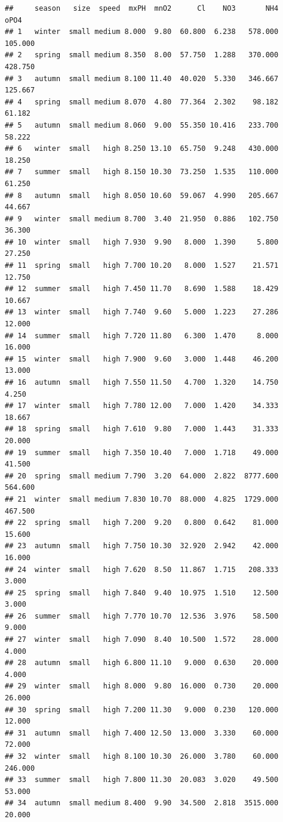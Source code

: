 \documentclass[]{report}
\begin{document}
\begin{verbatim}
##     season   size  speed  mxPH  mnO2      Cl    NO3       NH4    oPO4
## 1   winter  small medium 8.000  9.80  60.800  6.238   578.000 105.000
## 2   spring  small medium 8.350  8.00  57.750  1.288   370.000 428.750
## 3   autumn  small medium 8.100 11.40  40.020  5.330   346.667 125.667
## 4   spring  small medium 8.070  4.80  77.364  2.302    98.182  61.182
## 5   autumn  small medium 8.060  9.00  55.350 10.416   233.700  58.222
## 6   winter  small   high 8.250 13.10  65.750  9.248   430.000  18.250
## 7   summer  small   high 8.150 10.30  73.250  1.535   110.000  61.250
## 8   autumn  small   high 8.050 10.60  59.067  4.990   205.667  44.667
## 9   winter  small medium 8.700  3.40  21.950  0.886   102.750  36.300
## 10  winter  small   high 7.930  9.90   8.000  1.390     5.800  27.250
## 11  spring  small   high 7.700 10.20   8.000  1.527    21.571  12.750
## 12  summer  small   high 7.450 11.70   8.690  1.588    18.429  10.667
## 13  winter  small   high 7.740  9.60   5.000  1.223    27.286  12.000
## 14  summer  small   high 7.720 11.80   6.300  1.470     8.000  16.000
## 15  winter  small   high 7.900  9.60   3.000  1.448    46.200  13.000
## 16  autumn  small   high 7.550 11.50   4.700  1.320    14.750   4.250
## 17  winter  small   high 7.780 12.00   7.000  1.420    34.333  18.667
## 18  spring  small   high 7.610  9.80   7.000  1.443    31.333  20.000
## 19  summer  small   high 7.350 10.40   7.000  1.718    49.000  41.500
## 20  spring  small medium 7.790  3.20  64.000  2.822  8777.600 564.600
## 21  winter  small medium 7.830 10.70  88.000  4.825  1729.000 467.500
## 22  spring  small   high 7.200  9.20   0.800  0.642    81.000  15.600
## 23  autumn  small   high 7.750 10.30  32.920  2.942    42.000  16.000
## 24  winter  small   high 7.620  8.50  11.867  1.715   208.333   3.000
## 25  spring  small   high 7.840  9.40  10.975  1.510    12.500   3.000
## 26  summer  small   high 7.770 10.70  12.536  3.976    58.500   9.000
## 27  winter  small   high 7.090  8.40  10.500  1.572    28.000   4.000
## 28  autumn  small   high 6.800 11.10   9.000  0.630    20.000   4.000
## 29  winter  small   high 8.000  9.80  16.000  0.730    20.000  26.000
## 30  spring  small   high 7.200 11.30   9.000  0.230   120.000  12.000
## 31  autumn  small   high 7.400 12.50  13.000  3.330    60.000  72.000
## 32  winter  small   high 8.100 10.30  26.000  3.780    60.000 246.000
## 33  summer  small   high 7.800 11.30  20.083  3.020    49.500  53.000
## 34  autumn  small medium 8.400  9.90  34.500  2.818  3515.000  20.000

\end{verbatim}
\end{document}
